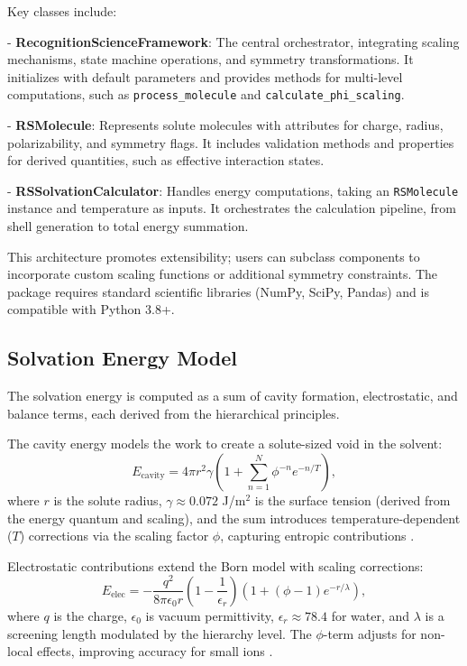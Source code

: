 \documentclass[twocolumn,prd,amsmath,amssymb,aps,superscriptaddress,nofootinbib]{revtex4-2}
\begin{document}
Key classes include:

- \textbf{RecognitionScienceFramework}: The central orchestrator, integrating scaling mechanisms, state machine operations, and symmetry transformations. It initializes with default parameters and provides methods for multi-level computations, such as \texttt{process\_molecule} and \texttt{calculate\_phi\_scaling}.

- \textbf{RSMolecule}: Represents solute molecules with attributes for charge, radius, polarizability, and symmetry flags. It includes validation methods and properties for derived quantities, such as effective interaction states.

- \textbf{RSSolvationCalculator}: Handles energy computations, taking an \texttt{RSMolecule} instance and temperature as inputs. It orchestrates the calculation pipeline, from shell generation to total energy summation.

This architecture promotes extensibility; users can subclass components to incorporate custom scaling functions or additional symmetry constraints. The package requires standard scientific libraries (NumPy, SciPy, Pandas) and is compatible with Python 3.8+.

\subsection{Solvation Energy Model}

The solvation energy is computed as a sum of cavity formation, electrostatic, and balance terms, each derived from the hierarchical principles.

The cavity energy models the work to create a solute-sized void in the solvent:
\begin{equation}
E_{\text{cavity}} = 4\pi r^2 \gamma \left(1 + \sum_{n=1}^{N} \phi^{-n} e^{-n/T}\right),
\end{equation}
where $r$ is the solute radius, $\gamma \approx 0.072$ J/m$^2$ is the surface tension (derived from the energy quantum and scaling), and the sum introduces temperature-dependent ($T$) corrections via the scaling factor $\phi$, capturing entropic contributions \cite{Chandler2005}.

Electrostatic contributions extend the Born model with scaling corrections:
\begin{equation}
E_{\text{elec}} = -\frac{q^2}{8\pi\epsilon_0 r} \left(1 - \frac{1}{\epsilon_r}\right) \left(1 + (\phi-1) e^{-r/\lambda}\right),
\end{equation}
where $q$ is the charge, $\epsilon_0$ is vacuum permittivity, $\epsilon_r \approx 78.4$ for water, and $\lambda$ is a screening length modulated by the hierarchy level. The $\phi$-term adjusts for non-local effects, improving accuracy for small ions \cite{Hunenberger1999}.
\end{document}
